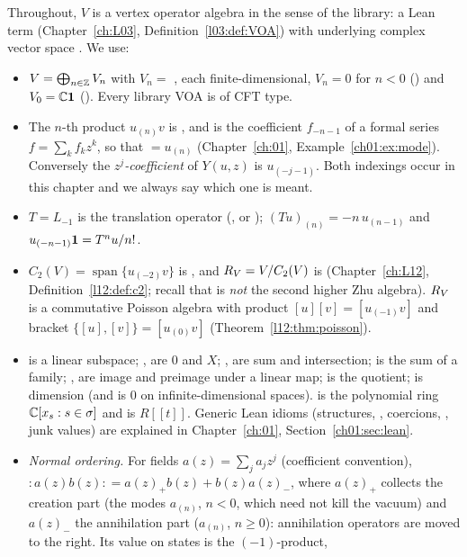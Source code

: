 Throughout, $V$ is a vertex operator algebra in the sense of the library: a Lean term
 (Chapter~\ref{ch:L03}, Definition~\ref{l03:def:VOA}) with
underlying complex vector space . We use:
\begin{itemize}
\item $V = \bigoplus_{n\in{\mathbb{Z}}}V_n$ with $V_n = $ , each finite-dimensional,
  $V_n = 0$ for $n<0$ () and $V_0 = {\mathbb{C}}\mathbf{1}$ (). Every
  library VOA is of CFT type.
\item The $n$-th product $u_{(n)}v$ is , and  is the coefficient
  $f_{-n-1}$ of a formal series $f=\sum_kf_kz^k$, so that  $=u_{(n)}$
  (Chapter~\ref{ch:01}, Example~\ref{ch01:ex:mode}). Conversely the \emph{$z^j$-coefficient}
   of $Y(u,z)$ is $u_{(-j-1)}$. Both indexings occur in this chapter and we always say
  which one is meant.
\item $T = L_{-1}$ is the translation operator (, or
  ); $(Tu)_{(n)} = -n\,u_{(n-1)}$ and $u_{(-n-1)}\mathbf{1} =
  T^nu/n!$.
\item $C_2(V) = \operatorname{span}\{u_{(-2)}v\}$ is , and $R_V = V/C_2(V)$ is
   (Chapter~\ref{ch:L12}, Definition~\ref{l12:def:c2}; recall that  is
  \emph{not} the second higher Zhu algebra). $R_V$ is a commutative Poisson algebra with
  product $[u][v] = [u_{(-1)}v]$ and bracket $\{[u],[v]\} = [u_{(0)}v]$
  (Theorem~\ref{l12:thm:poisson}).
\item {} is a linear subspace; ,  are $0$ and $X$; ,
   are sum and intersection;  is the sum of a family; ,
   are image and preimage under a linear map;  is the quotient;
   is dimension (and is $0$ on infinite-dimensional spaces).  is the polynomial ring ${\mathbb{C}}[x_s : s\in\sigma]$ and  is $R[[t]]$.
  Generic Lean idioms (structures, , coercions, , junk values) are explained in
  Chapter~\ref{ch:01}, Section~\ref{ch01:sec:lean}.
\item \emph{Normal ordering.} For fields $a(z) = \sum_ja_jz^j$ (coefficient convention), ${:}a(z)b(z){:} = a(z)_+b(z)+b(z)a(z)_-$,
  where $a(z)_+$ collects the creation part (the modes $a_{(n)}$, $n<0$, which need not kill the vacuum) and $a(z)_-$ the
  annihilation part ($a_{(n)}$, $n\ge0$): annihilation operators are moved to the right. Its value on states is the $(-1)$-product,

\end{itemize}

